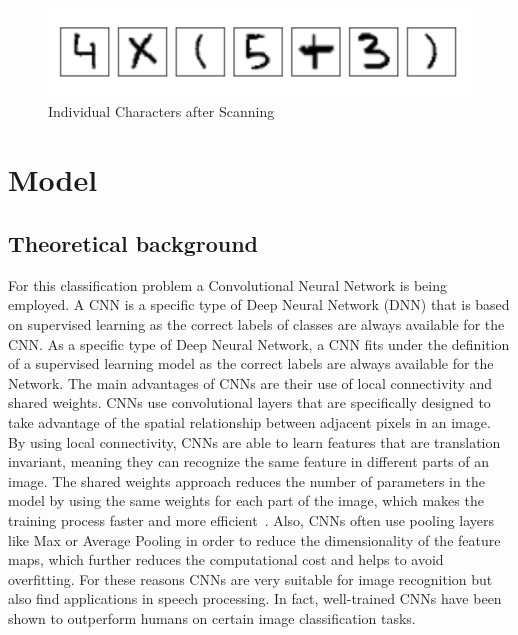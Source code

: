 \documentclass[@CLASSOPTIONS@]{tumarticle}
\begin{document}
\begin{figure}
    \begin{minipage}{0.48\textwidth}
     \centering
     \includegraphics[width=.9\linewidth]{figures/real_data_3}
     \caption{Individual Characters after Scanning}\label{Fig:Data6}
   \end{minipage}
\end{figure}

\section{Model}
\label{sec:implementation}


\subsection{Theoretical background}

For this classification problem a Convolutional Neural Network is being employed.
A CNN is a specific type of Deep Neural Network (DNN) that is based on supervised learning as the correct labels of
classes are always available for the CNN\@.
As a specific type of Deep Neural Network, a CNN fits under the definition of a supervised learning model as the correct
labels are always available for the Network.
The main advantages of CNNs are their use of local connectivity and shared weights.
CNNs use convolutional layers that are specifically designed to take advantage of the spatial relationship between
adjacent pixels in an image.
By using local connectivity, CNNs are able to learn features that are translation invariant, meaning they can
recognize the same feature in different parts of an image.
The shared weights approach reduces the number of parameters in the model by using the same weights for each part of the
image, which makes the training process faster and more efficient~\cite{reviewDL}.
Also, CNNs often use pooling layers like Max or Average Pooling in order to reduce the dimensionality of the feature maps,
which further reduces the computational cost and helps to avoid overfitting.
For these reasons CNNs are very suitable for image recognition but also find applications in speech
processing.
In fact, well-trained CNNs have been shown to outperform humans on certain image classification tasks.
\end{document}
